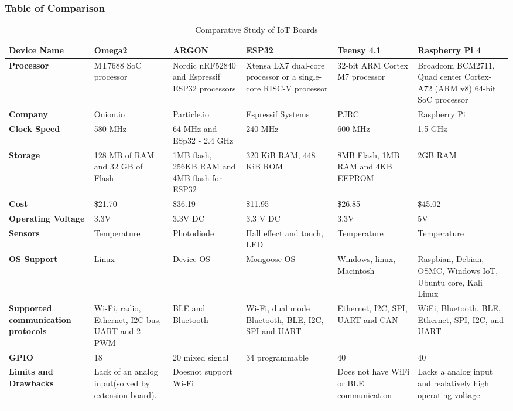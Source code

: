 \documentclass[a4paper,11pt]{article}
\begin{document}
\begin{iotsolution}
\subsubsection*{Table of Comparison}
\begin{center}
\label{tab:title}
\begin{longtable}{|p{2cm}| p{2.2cm} | p{2.5cm} | p{2.5cm} | p{2.2cm} | p{2cm} | }
\hline 
\textbf{Device Name} &  \textbf{Omega2} & \textbf{ARGON} & \textbf{ESP32} & \textbf{Teensy 4.1} & \textbf{Raspberry Pi 4} \\
\hline
\hline
\textbf{Processor} & MT7688 SoC processor &  Nordic nRF52840 and Espressif ESP32 processors & Xtensa LX7 dual-core processor or a single-core RISC-V processor &  32-bit ARM Cortex M7 processor & Broadcom BCM2711, Quad center Cortex-A72 (ARM v8) 64-bit SoC processor  \\
\hline
 \textbf{Company} & Onion.io & Particle.io & Espressif Systems & PJRC & Raspberry Pi \\
 \hline
 \textbf{Clock Speed} & 580 MHz & 64 MHz and ESp32 - 2.4 GHz  &  240 MHz & 600 MHz &  1.5 GHz \\
 \hline
\textbf{Storage} & 128 MB of RAM and 32 GB of Flash &	1MB flash, 256KB RAM and 4MB flash for ESP32&	320 KiB RAM, 448 KiB ROM&	8MB Flash, 1MB RAM and 4KB EEPROM&	2GB RAM   \\
\hline
\textbf{Cost} & \$21.70 &	\$36.19&	\$11.95& \$26.85&	\$45.02\\
 \hline
\textbf{Operating Voltage}  & 3.3V & 3.3V DC & 3.3 V DC &3.3V & 5V \\
\hline
\textbf{Sensors} & Temperature & Photodiode&	Hall effect and touch, LED&	Temperature&	 Temperature\\
 \hline
\textbf{OS Support} & Linux & Device OS & Mongoose OS & Windows, linux, Macintosh&	Raspbian, Debian, OSMC, Windows IoT, Ubuntu core, Kali Linux\\
\hline
 \textbf{Supported communication protocols} & Wi-Fi, radio, Ethernet, I2C bus, UART and 2 PWM&	BLE and Bluetooth&	Wi-Fi, dual mode Bluetooth, BLE,  I2C, SPI and UART&	Ethernet, I2C, SPI, UART and CAN&	WiFi, Bluetooth, BLE, Ethernet, SPI, I2C, and UART \\
 \hline
 \textbf{GPIO} & 18 & 20 mixed signal & 34 programmable  & 40 & 40\\
\hline
\textbf{Limits and Drawbacks} & Lack of an analog input(solved by extension board).&	Doesnot support Wi-Fi& &		Does not have WiFi or BLE communication&	Lacks a analog input and realatively high operating voltage\\
\hline
\caption{Comparative Study of IoT Boards  \cite{[A7]} \cite{tewari2021comparative}}
\end{longtable}


\end{center}
\end{iotsolution}
\end{document}

